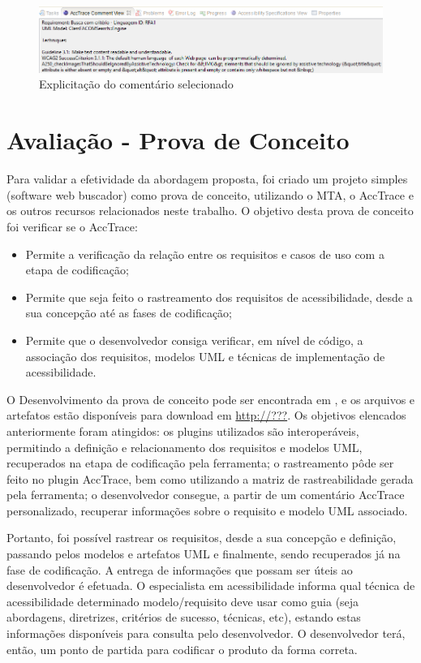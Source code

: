 \documentclass[runningheads,a4paper]{llncs}
\begin{document}
\begin{figure}[h!]
\centering
\includegraphics[scale=0.45]{./img/commentview.png}
\caption{Explicitação do comentário selecionado}
\label{fig:commentview}
\end{figure}

\section{Avaliação - Prova de Conceito}

Para validar a efetividade da abordagem proposta, foi criado um projeto simples (software web buscador) como prova de conceito, utilizando o MTA, o AccTrace e os outros recursos relacionados neste trabalho. O objetivo desta prova de conceito foi verificar se o AccTrace:

\begin{itemize}
  \item Permite a verificação da relação entre os requisitos e casos de uso com a etapa de codificação;
  \item Permite que seja feito o rastreamento dos requisitos de acessibilidade, desde a sua concepção até as fases de codificação;
  \item Permite que o desenvolvedor consiga verificar, em nível de código, a associação dos requisitos, modelos UML e técnicas de implementação de acessibilidade.
\end{itemize}

O Desenvolvimento da prova de conceito pode ser encontrada em \cite{branco:13}, e os arquivos e artefatos estão disponíveis para download em \url{http://???}. Os objetivos elencados anteriormente foram atingidos: os plugins utilizados são interoperáveis, permitindo a definição e relacionamento dos requisitos e modelos UML, recuperados na etapa de codificação pela ferramenta; o rastreamento pôde ser feito no plugin AccTrace, bem como utilizando a matriz de rastreabilidade gerada pela ferramenta; o desenvolvedor consegue, a partir de um comentário AccTrace personalizado, recuperar informações sobre o requisito e modelo UML associado.

Portanto, foi possível rastrear os requisitos, desde a sua concepção e definição, passando
pelos modelos e artefatos UML e finalmente, sendo recuperados já na fase de
codificação. A entrega de informações que possam ser úteis ao desenvolvedor é efetuada.
O especialista em acessibilidade informa qual técnica de acessibilidade determinado
modelo/requisito deve usar como guia (seja abordagens, diretrizes, critérios de sucesso,
técnicas, etc), estando estas informações disponíveis para consulta pelo desenvolvedor. O
desenvolvedor terá, então, um ponto de partida para codificar o produto da forma correta.
\end{document}
